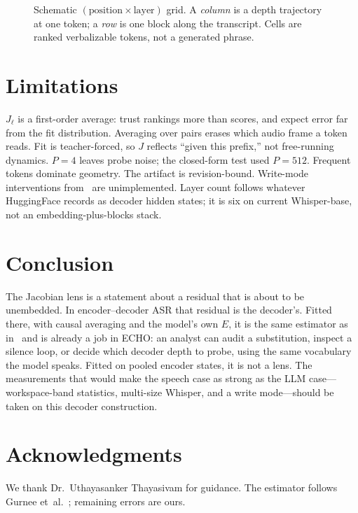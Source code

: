 \documentclass[conference]{IEEEtran}
\begin{document}
\begin{figure}[!t]
\centering
{}
\caption{Schematic \((\text{position}\times\text{layer})\) grid. A \emph{column} is a depth trajectory at one token; a \emph{row} is one block along the transcript. Cells are ranked verbalizable tokens, not a generated phrase.}
\label{fig:grid}
\end{figure}

\section{Limitations}

\(J_\ell\) is a first-order average: trust rankings more than scores, and expect error far from the fit distribution. Averaging over pairs erases which audio frame a token reads. Fit is teacher-forced, so \(J\) reflects ``given this prefix,'' not free-running dynamics. \(P=4\) leaves probe noise; the closed-form test used \(P=512\). Frequent tokens dominate geometry. The artifact is revision-bound. Write-mode interventions from~\cite{gurnee2026workspace} are unimplemented. Layer count follows whatever HuggingFace records as decoder hidden states; it is six on current Whisper-base, not an embedding-plus-blocks stack.

\section{Conclusion}

The Jacobian lens is a statement about a residual that is about to be unembedded. In encoder--decoder ASR that residual is the decoder's. Fitted there, with causal averaging and the model's own \(E\), it is the same estimator as in~\cite{gurnee2026workspace} and is already a job in ECHO: an analyst can audit a substitution, inspect a silence loop, or decide which decoder depth to probe, using the same vocabulary the model speaks. Fitted on pooled encoder states, it is not a lens. The measurements that would make the speech case as strong as the LLM case---workspace-band statistics, multi-size Whisper, and a write mode---should be taken on this decoder construction.

\section*{Acknowledgments}

We thank Dr.~Uthayasanker Thayasivam for guidance. The estimator follows Gurnee et~al.~\cite{gurnee2026workspace}; remaining errors are ours.

\balance


\end{document}
